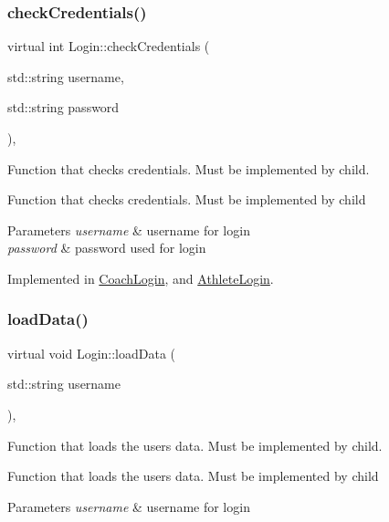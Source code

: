 \subsubsection{\texorpdfstring{checkCredentials()}{checkCredentials()}}
{\footnotesize\ttfamily virtual int Login\+::check\+Credentials (\begin{DoxyParamCaption}\item[{std\+::string}]{username,  }\item[{std\+::string}]{password }\end{DoxyParamCaption})\hspace{0.3cm}{\ttfamily [protected]}, {}}



Function that checks credentials. Must be implemented by child. 

Function that checks credentials. Must be implemented by child 
\begin{DoxyParams}{Parameters}
{\em username} & username for login \\
\hline
{\em password} & password used for login \\
\hline
\end{DoxyParams}


Implemented in \mbox{\hyperlink{classCoachLogin_a68ad4e904820d7a95d842e159fbc9edc}{Coach\+Login}}, and \mbox{\hyperlink{classAthleteLogin_a6cd600072b11803af3ca93442c11b7d9}{Athlete\+Login}}.

\mbox{\label{classLogin_aaa5bbdeef3c24022901a294af5f2be39}} 
\subsubsection{\texorpdfstring{loadData()}{loadData()}}
{\footnotesize\ttfamily virtual void Login\+::load\+Data (\begin{DoxyParamCaption}\item[{std\+::string}]{username }\end{DoxyParamCaption})\hspace{0.3cm}{\ttfamily [protected]}, {}}



Function that loads the users data. Must be implemented by child. 

Function that loads the users data. Must be implemented by child 
\begin{DoxyParams}{Parameters}
{\em username} & username for login \\
\hline
\end{DoxyParams}


